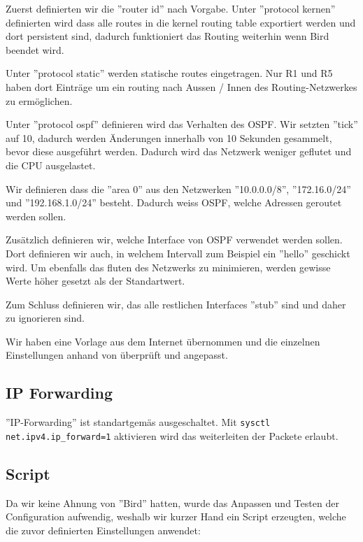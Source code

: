 \documentclass[11pt,titlepage]{article}
\begin{document}
Zuerst definierten wir die ''router id'' nach Vorgabe.
\medskip
Unter ''protocol kernen'' definierten wird dass alle routes in die kernel routing table exportiert werden und dort persistent sind, dadurch funktioniert das Routing weiterhin wenn Bird beendet wird.

\medskip
Unter ''protocol static'' werden statische routes eingetragen. Nur R1 und R5 haben dort Einträge um ein routing nach Aussen / Innen des Routing-Netzwerkes zu ermöglichen.

\medskip
Unter ''protocol ospf'' definieren wird das Verhalten des OSPF. Wir setzten ''tick'' auf 10, dadurch werden Änderungen innerhalb von 10 Sekunden gesammelt, bevor diese ausgeführt werden. Dadurch wird das Netzwerk weniger geflutet und die CPU ausgelastet.

Wir definieren dass die ''area 0'' aus den Netzwerken ''10.0.0.0/8'', ''172.16.0/24'' und ''192.168.1.0/24'' besteht. Dadurch weiss OSPF, welche Adressen geroutet werden sollen.

Zusätzlich definieren wir, welche Interface von OSPF verwendet werden sollen. Dort definieren wir auch, in welchem Intervall zum Beispiel ein ''hello'' geschickt wird.
Um ebenfalls das fluten des Netzwerks zu minimieren, werden gewisse Werte höher gesetzt als der Standartwert.

Zum Schluss definieren wir, das alle restlichen Interfaces ''stub'' sind und daher zu ignorieren sind.

\medskip
Wir haben eine Vorlage aus dem Internet übernommen \cite{BIRD_EXAMPLE} und die einzelnen Einstellungen anhand von \cite{BIRD_DOC} überprüft und angepasst.

\subsection{IP Forwarding}
\label{subsec:IPForwarding}

''IP-Forwarding'' ist standartgemäs ausgeschaltet. Mit \lstinline!sysctl net.ipv4.ip_forward=1! aktivieren wird das weiterleiten der Packete erlaubt.

\par\medskip

\subsection{Script}
\label{subsec:Script}

Da wir keine Ahnung von ''Bird'' hatten, wurde das Anpassen und Testen der Configuration aufwendig, weshalb wir kurzer Hand ein Script erzeugten, welche die zuvor definierten Einstellungen anwendet:
\end{document}

